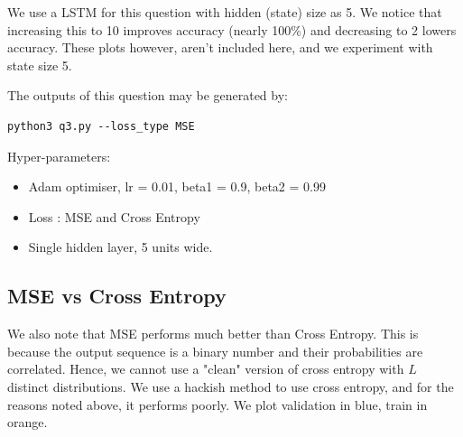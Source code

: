 We use a LSTM for this question with hidden (state) size as 5. We notice that increasing this to 10 improves accuracy (nearly 100\%) and decreasing to 2 lowers accuracy. These plots however, aren't included here, and we experiment with state size 5.

The outputs of this question may be generated by:

\begin{lstlisting}
python3 q3.py --loss_type MSE
\end{lstlisting} 

Hyper-parameters:
\begin{itemize}
\item  Adam optimiser, lr = 0.01, beta1 = 0.9, beta2 = 0.99
\item  Loss : MSE and Cross Entropy
\item  Single hidden layer, 5 units wide.
\end{itemize}

\subsection{MSE vs Cross Entropy}

We also note that MSE performs much better than Cross Entropy. This is because the output sequence is a binary number and their probabilities are correlated. Hence, we cannot use a "clean" version of cross entropy with $L$ distinct distributions. We use a hackish method to use cross entropy, and for the reasons noted above, it performs poorly. We plot validation in blue, train in orange.


